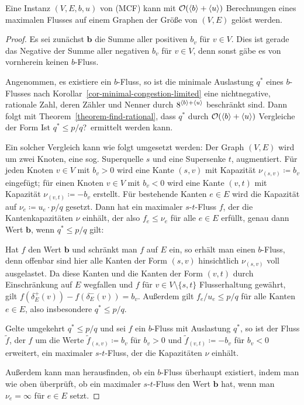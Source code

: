 \begin{theorem}
	Eine Instanz $(V,E,b,u)$ von (MCF) kann mit $\mathcal{O}(\langle b\rangle + \langle u\rangle)$ Berechnungen eines maximalen Flusses auf einem Graphen der Größe von $(V,E)$ gelöst werden.
\end{theorem}
\begin{proof}
	Es sei zunächst $\mathbf{b}$ die Summe aller positiven $b_v$ für $v\in V$.
	Dies ist gerade das Negative der Summe aller negativen $b_v$ für $v\in V$, denn sonst gäbe es von vornherein keinen $b$-Fluss.
	
	Angenommen, es existiere ein $b$-Fluss, so ist die minimale Auslastung $q^*$ eines $b$-Flusses nach Korollar~\ref{cor-minimal-congestion-limited} eine nichtnegative, rationale Zahl, deren Zähler und Nenner durch $8^{\langle b\rangle + \langle u\rangle}$ beschränkt sind.
	Dann folgt mit Theorem~\ref{theorem-find-rational}, dass $q^*$ durch $\mathcal{O}(\langle b\rangle + \langle u\rangle)$ Vergleiche der Form \glqq Ist $q^*\leq p/q$?\grqq\ ermittelt werden kann.
	
	Ein solcher Vergleich kann wie folgt umgesetzt werden:
	Der Graph $(V,E)$ wird um zwei Knoten, eine sog. Superquelle $s$ und eine Supersenke $t$, augmentiert.
	Für jeden Knoten $v\in V$ mit $b_v > 0$ wird eine Kante $(s,v)$ mit Kapazität $\nu_{(s,v)}\coloneq b_v$ eingefügt; für einen Knoten $v\in V$ mit $b_v < 0$ wird eine Kante $(v,t)$ mit Kapazität $\nu_{(v,t)}\coloneq -b_v$ erstellt.
	Für bestehende Kanten $e\in E$ wird die Kapazität auf $\nu_e \coloneq u_e \cdot p / q$ gesetzt.
	Dann hat ein maximaler $s$-$t$-Fluss $f$, der die Kantenkapazitäten $\nu$ einhält, der also $f_e\leq \nu_e$ für alle $e\in E$ erfüllt, genau dann Wert $\mathbf{b}$, wenn $q^*\leq p/q$ gilt:
	
	Hat $f$ den Wert $\mathbf{b}$ und schränkt man $f$ auf $E$ ein, so erhält man einen $b$-Fluss, denn offenbar sind hier alle Kanten der Form $(s,v)$ hinsichtlich $\nu_{(s,v)}$ voll ausgelastet.
	Da diese Kanten und die Kanten der Form $(v,t)$ durch Einschränkung auf $E$ wegfallen und $f$ für $v\in V\setminus\{ s, t \}$ Flusserhaltung gewährt, gilt $f(\delta^+_E(v)) - f(\delta^-_E(v)) = b_v$.
	Außerdem gilt $f_e/u_e \leq p/q$ für alle Kanten $e\in E$, also insbesondere $q^*\leq p/q$.
	
	Gelte umgekehrt $q^* \leq p/q$ und sei $f$ ein $b$-Fluss mit Auslastung $q^*$, so ist der Fluss $\tilde{f}$, der $f$ um die Werte $\tilde{f}_{(s,v)}\coloneq b_v$ für $b_v > 0$ und $\tilde{f}_{(v,t)}\coloneq -b_v$ für $b_v < 0$ erweitert, ein maximaler $s$-$t$-Fluss, der die Kapazitäten $\nu$ einhält.
	
	Außerdem kann man herausfinden, ob ein $b$-Fluss überhaupt existiert, indem man wie oben überprüft, ob ein maximaler $s$-$t$-Fluss den Wert $\mathbf{b}$ hat, wenn man $\nu_e=\infty$ für $e\in E$ setzt.
\end{proof}

